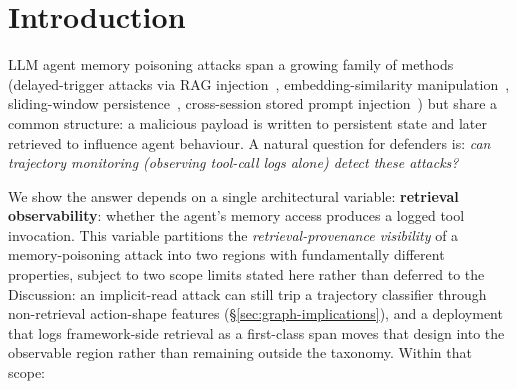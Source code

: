 \documentclass{article}
\begin{document}
\begin{abstract}
We then falsify the detector's standalone use. Benign memory-grounded sends are trajectory-isomorphic: unconditional false-positive rate $24.7$--$57.6\%$ on a 13-model factorial ($N{=}4{,}160$), $100\%$ conditional on the transition, and $100\%$ under a genuine LangGraph framework. Positive predictive value is ${\leq}3.85\%$ at $1\%$ attack prevalence. Attack success and signature rate are decoupled ($r{=}0.031$; models with $0\%$ success still produce $100\%$ signature rates). The obvious fix, recipient-metadata gating, flags $129/129$ of \emph{legitimate} external business email, and the combined trajectory-and-recipient gate still flags $45\%$. The signature is therefore an attack \emph{precondition}, not a maliciousness predicate, and the classifier we fit on it is a measurement instrument rather than a contribution. Two scope limits bound the ceiling itself: it constrains only methods whose observation model is the agent-visible tool-call log, so a deployment that logs framework-side retrieval as a first-class span escapes it; and what implicit delivery removes is the retrieval \emph{provenance}, not necessarily any alert, since an attack implicit on the read axis but tool-routed on the write axis still leaves a save-before-send trace.
\end{abstract}

\section{Introduction}
\label{sec:intro}

LLM agent memory poisoning attacks span a growing family of methods (delayed-trigger attacks via RAG injection~\citep{leong2026defense}, embedding-similarity manipulation~\citep{shao2025minja}, sliding-window persistence~\citep{yang2026zombie}, cross-session stored prompt injection~\citep{xie2026crosssession}) but share a common structure: a malicious payload is written to persistent state and later retrieved to influence agent behaviour. A natural question for defenders is: \emph{can trajectory monitoring (observing tool-call logs alone) detect these attacks?}

We show the answer depends on a single architectural variable: \textbf{retrieval observability}: whether the agent's memory access produces a logged tool invocation. This variable partitions the \emph{retrieval-provenance visibility} of a memory-poisoning attack into two regions with fundamentally different properties, subject to two scope limits stated here rather than deferred to the Discussion: an implicit-read attack can still trip a trajectory classifier through non-retrieval action-shape features (\S\ref{sec:graph-implications}), and a deployment that logs framework-side retrieval as a first-class span moves that design into the observable region rather than remaining outside the taxonomy. Within that scope:
\end{document}
